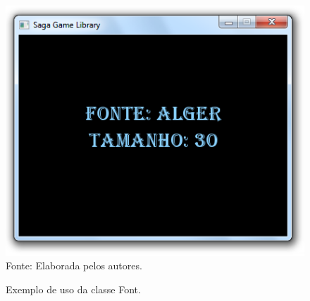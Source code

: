 \begin{figure}[H]
    \centering
    \caption{Exemplo de uso da classe Font.}
    \label{ExemploFont}
    \includegraphics[scale = 0.70]{Imagens/ExemploFont.png}
    \\Fonte: Elaborada pelos autores.
\end{figure}
%
%
%
